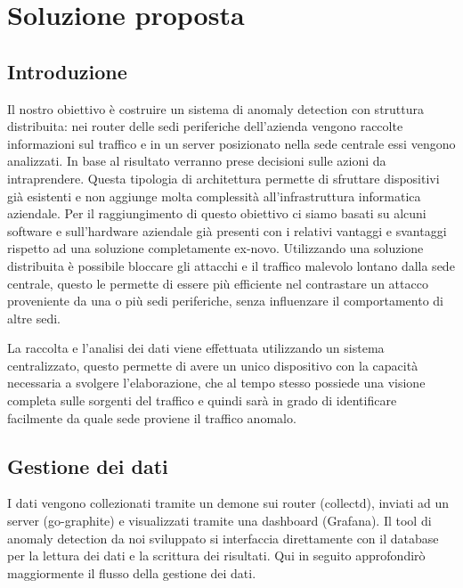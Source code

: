 \chapter{Soluzione proposta}

\section{Introduzione}
Il nostro obiettivo è costruire un sistema di anomaly detection con struttura distribuita: nei router delle sedi periferiche dell'azienda vengono raccolte informazioni sul traffico e in un server posizionato nella sede centrale essi vengono analizzati. In base al risultato verranno prese decisioni sulle azioni da intraprendere. Questa tipologia di architettura permette di sfruttare dispositivi già esistenti e non aggiunge molta complessità all'infrastruttura informatica aziendale. Per il raggiungimento di questo obiettivo ci siamo basati su alcuni software e sull'hardware aziendale già presenti con i relativi vantaggi e svantaggi rispetto ad una soluzione completamente ex-novo.
Utilizzando una soluzione distribuita è possibile bloccare gli attacchi e il traffico malevolo lontano dalla sede centrale, questo le permette di essere più efficiente nel contrastare un attacco proveniente da una o più sedi periferiche, senza influenzare il comportamento di altre sedi.

La raccolta e l'analisi dei dati viene effettuata utilizzando un sistema centralizzato, questo permette di avere un unico dispositivo con la capacità necessaria a svolgere l'elaborazione, che al tempo stesso possiede una visione completa sulle sorgenti del traffico e quindi sarà in grado di identificare facilmente da quale sede proviene il traffico anomalo.


\section{Gestione dei dati}

I dati vengono collezionati tramite un demone sui router (collectd), inviati ad un server (go-graphite) e visualizzati tramite una dashboard (Grafana). Il tool di anomaly detection da noi sviluppato si interfaccia direttamente con il database per la lettura dei dati e la scrittura dei risultati.
Qui in seguito approfondirò maggiormente il flusso della gestione dei dati.

